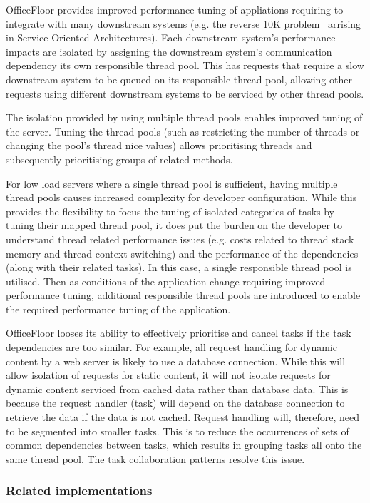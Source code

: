 \documentclass[prodmode]{style/acmlarge}
\begin{document}
OfficeFloor provides improved performance tuning of appliations requiring to
integrate with many downstream systems (e.g. the reverse 10K
problem~\cite{reverse-ten-k-problem} arrising in Service-Oriented
Architectures).  Each downstream system's performance impacts are isolated by
assigning the downstream system's communication dependency its own responsible
thread pool.  This has requests that require a slow downstream system to be
queued on its responsible thread pool, allowing other requests using different
downstream systems to be serviced by other thread pools.

The isolation provided by using multiple thread pools enables improved tuning of
the server.  Tuning the thread pools (such as restricting the number of threads
or changing the pool's thread nice values) allows prioritising threads and
subsequently prioritising groups of related methods.

For low load servers where a single thread pool is sufficient, having multiple
thread pools causes increased complexity for developer configuration.  While
this provides the flexibility to focus the tuning of isolated categories of
tasks by tuning their mapped thread pool, it does put the burden on the
developer to understand thread related performance issues (e.g. costs related to
thread stack memory and thread-context switching) and the performance of the
dependencies (along with their related tasks).  In this case, a single
responsible thread pool is utilised.  Then as conditions of the application
change requiring improved performance tuning, additional responsible thread
pools are introduced to enable the required performance tuning of the
application.

OfficeFloor looses its ability to effectively prioritise and cancel tasks if the
task dependencies are too similar.  For example, all request handling for
dynamic content by a web server is likely to use a database connection.  While
this will allow isolation of requests for static content, it will not isolate
requests for dynamic content serviced from cached data rather than database
data.  This is because the request handler (task) will depend on the database
connection to retrieve the data if the data is not cached.  Request handling
will, therefore, need to be segmented into smaller tasks.  This is to reduce the
occurrences of sets of common dependencies between tasks, which results in
grouping tasks all onto the same thread pool.  The task collaboration patterns
resolve this issue.


\subsubsection*{Related implementations}
\end{document}
